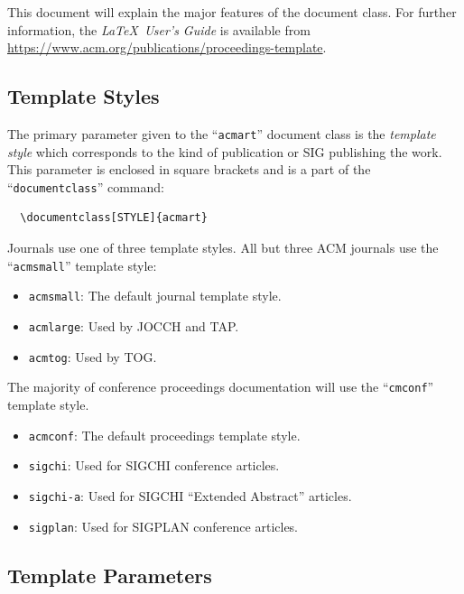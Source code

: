 \documentclass[manuscript,screen]{acmart}
\providecommand{\tightlist}{%
  \setlength{\itemsep}{0pt}\setlength{\parskip}{0pt}}\usepackage{longtable,booktabs,array}
\begin{document}
This document will explain the major features of the document class. For
further information, the \emph{\LaTeX~User's Guide} is available from
\url{https://www.acm.org/publications/proceedings-template}.

\hypertarget{template-styles}{%
\subsection{Template Styles}\label{template-styles}}

The primary parameter given to the ``\texttt{acmart}'' document class is
the \emph{template style} which corresponds to the kind of publication
or SIG publishing the work. This parameter is enclosed in square
brackets and is a part of the ``\texttt{documentclass}'' command:

\begin{verbatim}
  \documentclass[STYLE]{acmart}
\end{verbatim}

Journals use one of three template styles. All but three ACM journals
use the ``\texttt{acmsmall}'' template style:

\begin{itemize}
\tightlist
\item
  \texttt{acmsmall}: The default journal template style.
\item
  \texttt{acmlarge}: Used by JOCCH and TAP.
\item
  \texttt{acmtog}: Used by TOG.
\end{itemize}

The majority of conference proceedings documentation will use the
``\texttt{cmconf}'' template style.

\begin{itemize}
\tightlist
\item
  \texttt{acmconf}: The default proceedings template style.
\item
  \texttt{sigchi}: Used for SIGCHI conference articles.
\item
  \texttt{sigchi-a}: Used for SIGCHI ``Extended Abstract'' articles.
\item
  \texttt{sigplan}: Used for SIGPLAN conference articles.
\end{itemize}

\hypertarget{template-parameters}{%
\subsection{Template Parameters}\label{template-parameters}}
\end{document}
